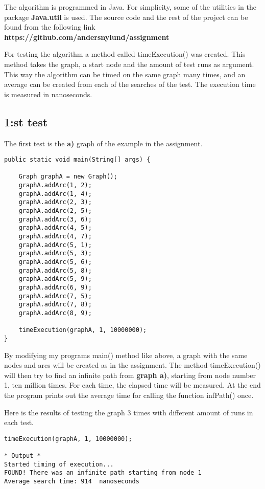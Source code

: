 \documentclass[]{article}
\begin{document}
The algorithm is programmed in Java. For simplicity, some of the utilities in the package \textbf{Java.util} is used. The source code and the rest of the project can be found from the following link \textbf{https://github.com/andersnylund/assignment}

For testing the algorithm a method called timeExecution() was created. This method takes the graph, a start node and the amount of test runs as argument. This way the  algorithm can be timed on the same graph many times, and an average can be created from each of the searches of the test. The execution time is measured in nanoseconds.

\subsection*{1:st test}

The first test is the \textbf{a)} graph of the example in the assignment. 

\begin{lstlisting}
public static void main(String[] args) {

	Graph graphA = new Graph();
	graphA.addArc(1, 2);
	graphA.addArc(1, 4);
	graphA.addArc(2, 3);
	graphA.addArc(2, 5);
	graphA.addArc(3, 6);
	graphA.addArc(4, 5);
	graphA.addArc(4, 7);
	graphA.addArc(5, 1);
	graphA.addArc(5, 3);
	graphA.addArc(5, 6);
	graphA.addArc(5, 8);
	graphA.addArc(5, 9);
	graphA.addArc(6, 9);
	graphA.addArc(7, 5);
	graphA.addArc(7, 8);
	graphA.addArc(8, 9);

	timeExecution(graphA, 1, 10000000);
}
\end{lstlisting}
By modifying my programs main() method like above, a graph with the same nodes and arcs will be created as in the assignment. The method timeExecution() will then try to find an infinite path from \textbf{graph a)}, starting from node number 1, ten million times. For each time, the elapsed time will be measured. At the end the program prints out the average time for calling the function infPath() once. \newpage

Here is the results of testing the graph 3 times with different amount of runs in each test.


\begin{lstlisting}
timeExecution(graphA, 1, 10000000);

* Output *
Started timing of execution...
FOUND! There was an infinite path starting from node 1
Average search time: 914  nanoseconds
\end{lstlisting}
\end{document}
